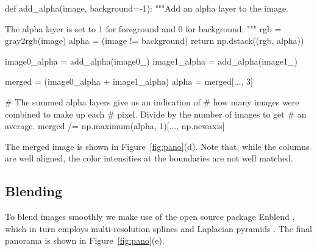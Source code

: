     \begin{pyverbatim}
      def add_alpha(image, background=-1):
          """Add an alpha layer to the image.

          The alpha layer is set to 1 for foreground
          and 0 for background.
          """
          rgb = gray2rgb(image)
          alpha = (image != background)
          return np.dstack((rgb, alpha))

      image0_alpha = add_alpha(image0_)
      image1_alpha = add_alpha(image1_)

      merged = (image0_alpha + image1_alpha)
      alpha = merged[..., 3]

      # The summed alpha layers give us an indication of
      # how many images were combined to make up each
      # pixel.  Divide by the number of images to get
      # an average.
      merged /= np.maximum(alpha, 1)[..., np.newaxis]
    \end{pyverbatim}

    The merged image is shown in Figure~\ref{fig:pano}(d). Note that, while the columns are well aligned, the color intensities at the boundaries are not well matched.

  

  \subsection{Blending}
    \label{sub:blending}

    To blend images smoothly we make use of the open source package Enblend \citep{Enblend}, which in turn employs multi-resolution splines and Laplacian pyramids \citep{burt_adelson_0,burt_adelson_1}. The final panorama is shown in Figure~\ref{fig:pano}(e).
